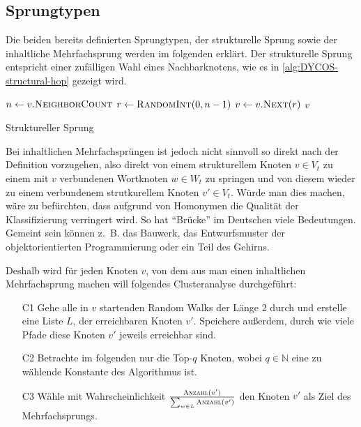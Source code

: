 \subsection{Sprungtypen}
Die beiden bereits definierten Sprungtypen, der strukturelle Sprung
sowie der inhaltliche Mehrfachsprung werden im folgenden erklärt.
\goodbreak
Der strukturelle Sprung entspricht einer zufälligen Wahl eines 
Nachbarknotens, wie es in \cref{alg:DYCOS-structural-hop}
gezeigt wird.
\begin{algorithm}[H]
    \begin{algorithmic}[1]
            \State $n \gets v.\Call{NeighborCount}{}$ 
            \State $r \gets \Call{RandomInt}{0, n-1}$ 
            \State $v \gets v.\Call{Next}{r}$ 
            \State \Return $v$
        \EndProcedure
    \end{algorithmic}
\caption{Struktureller Sprung}
\label{alg:DYCOS-structural-hop}
\end{algorithm}

Bei inhaltlichen Mehrfachsprüngen ist jedoch nicht sinnvoll so direkt
nach der Definition vorzugehen,  also
direkt von einem strukturellem Knoten 
$v \in V_t$ zu einem mit $v$ verbundenen Wortknoten $w \in W_t$ zu springen
und von diesem wieder zu einem verbundenem strutkurellem Knoten 
$v' \in V_t$. Würde man dies machen, wäre zu befürchten, dass
aufgrund von Homonymen die Qualität der Klassifizierung verringert
wird. So hat \enquote{Brücke} im Deutschen viele Bedeutungen.
Gemeint sein können z.~B. das Bauwerk, das Entwurfsmuster der
objektorientierten Programmierung oder ein Teil des Gehirns.

Deshalb wird für jeden Knoten $v$, von dem aus man einen inhaltlichen
Mehrfachsprung machen will folgendes Clusteranalyse durchgeführt:
\begin{enumerate}[label=C\arabic*),ref=C\arabic*]
    \item[C1] Gehe alle in $v$ startenden Random Walks der Länge 2 durch
          und erstelle eine Liste $L$, der erreichbaren Knoten $v'$. Speichere
          außerdem, durch wie viele Pfade diese Knoten $v'$ jeweils erreichbar sind.
    \item[C2] Betrachte im folgenden nur die Top-$q$ Knoten, wobei $q \in \mathbb{N}$
          eine zu wählende Konstante des Algorithmus ist. \label{list:aggregate.2}
    \item[C3] Wähle mit Wahrscheinlichkeit $\frac{\Call{Anzahl}{v'}}{\sum_{w \in L} \Call{Anzahl}{v'}}$
          den Knoten $v'$ als Ziel des Mehrfachsprungs.
\end{enumerate}

